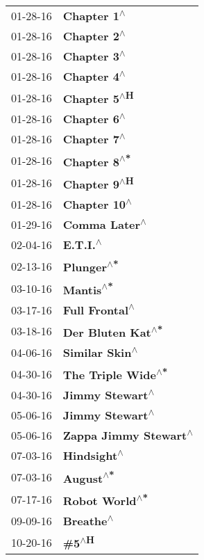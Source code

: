 \begin{supertabular}{p{0.25\columnwidth}p{0.75\columnwidth}}
 01-28-16 &            \textbf{Chapter 1\textsuperscript{$\wedge$}} \\
 01-28-16 &            \textbf{Chapter 2\textsuperscript{$\wedge$}} \\
 01-28-16 &            \textbf{Chapter 3\textsuperscript{$\wedge$}} \\
 01-28-16 &            \textbf{Chapter 4\textsuperscript{$\wedge$}} \\
 01-28-16 &           \textbf{Chapter 5\textsuperscript{$\wedge$H}} \\
 01-28-16 &            \textbf{Chapter 6\textsuperscript{$\wedge$}} \\
 01-28-16 &            \textbf{Chapter 7\textsuperscript{$\wedge$}} \\
 01-28-16 &           \textbf{Chapter 8\textsuperscript{$\wedge$*}} \\
 01-28-16 &           \textbf{Chapter 9\textsuperscript{$\wedge$H}} \\
 01-28-16 &           \textbf{Chapter 10\textsuperscript{$\wedge$}} \\
 01-29-16 &          \textbf{Comma Later\textsuperscript{$\wedge$}} \\
 02-04-16 &               \textbf{E.T.I.\textsuperscript{$\wedge$}} \\
 02-13-16 &             \textbf{Plunger\textsuperscript{$\wedge$*}} \\
 03-10-16 &              \textbf{Mantis\textsuperscript{$\wedge$*}} \\
 03-17-16 &         \textbf{Full Frontal\textsuperscript{$\wedge$}} \\
 03-18-16 &      \textbf{Der Bluten Kat\textsuperscript{$\wedge$*}} \\
 04-06-16 &         \textbf{Similar Skin\textsuperscript{$\wedge$}} \\
 04-30-16 &     \textbf{The Triple Wide\textsuperscript{$\wedge$*}} \\
 04-30-16 &        \textbf{Jimmy Stewart\textsuperscript{$\wedge$}} \\
 05-06-16 &        \textbf{Jimmy Stewart\textsuperscript{$\wedge$}} \\
 05-06-16 &  \textbf{Zappa Jimmy Stewart\textsuperscript{$\wedge$}} \\
 07-03-16 &            \textbf{Hindsight\textsuperscript{$\wedge$}} \\
 07-03-16 &              \textbf{August\textsuperscript{$\wedge$*}} \\
 07-17-16 &         \textbf{Robot World\textsuperscript{$\wedge$*}} \\
 09-09-16 &              \textbf{Breathe\textsuperscript{$\wedge$}} \\
 10-20-16 &                 \textbf{\#5\textsuperscript{$\wedge$H}} \\
\end{supertabular}
